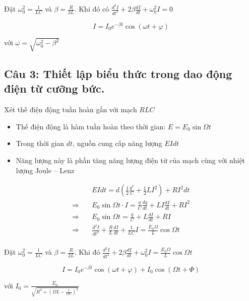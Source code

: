 Đặt $\omega_0^2 = \frac{1}{LC}$ và $\beta = \frac{R}{2L}$. Khi đó có $\frac{d^2I}{dt^2} + 2\beta\frac{dI}{dt} + \omega_0^2 I = 0$

\begin{equation*}
  I = I_0 e^{-\beta t} \cos\left( \omega t + \varphi \right)
\end{equation*}

với $\omega = \sqrt{\omega_0^2 - \beta^2}$

\subsection[Câu 3]{Câu 3: Thiết lập biểu thức trong dao động điện từ cưỡng bức.}

Xét thế điện động tuần hoàn gắn với mạch $RLC$

\begin{itemize}
  \item Thế điện động là hàm tuần hoàn theo thời gian: $E = E_0 \sin \Omega t$
  \item Trong thời gian $dt$, nguồn cung cấp năng lượng $EIdt$
  \item Năng lượng này là phần tăng năng lượng điện từ của mạch cùng với nhiệt lượng Joule -- Lenz
\end{itemize}

\begin{align*}
  {}\quad & EIdt = d\left( \frac{1}{2}\frac{q^2}{C} + \frac{1}{2} LI^2 \right) + RI^2dt \\
  \Rightarrow\quad & E_0\sin\Omega t \cdot I = \frac{q}{C} \frac{dq}{dt} + LI\frac{dI}{dt} + RI^2 \\
  \Rightarrow\quad & E_0\sin\Omega t = \frac{q}{C} + L\frac{dI}{dt} + RI \\
  \Rightarrow\quad & \frac{d^2I}{dt^2} + \frac{R}{L} \frac{dI}{dt} + \frac{1}{LC} I = \frac{E_0 \Omega}{L} \cos \Omega t \\
\end{align*}

Đặt $\omega_0^2 = \frac{1}{LC}$ và $\beta = \frac{R}{2L}$. Khi đó $\frac{d^2I}{dt^2} + 2\beta\frac{dI}{dt} + \omega_0^2 I = \frac{E_0 \Omega}{L} \cos \Omega t$

\begin{equation*}
  I = I_0 e^{-\beta t} \cos (\omega t + \varphi) + I_0 \cos \left( \Omega t + \Phi \right)
\end{equation*}

với $I_0 = \frac{E_0}{\sqrt{R^2 + \left( \Omega L - \frac{1}{\Omega C} \right)^2}}$